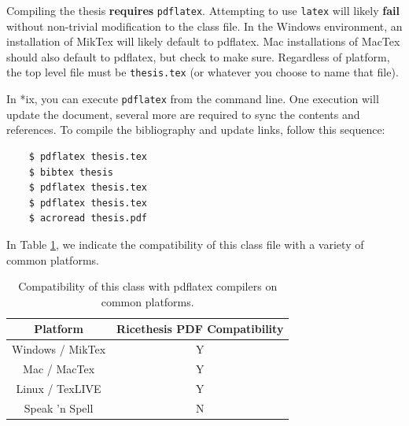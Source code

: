 Compiling the thesis \textbf{requires} \verb+pdflatex+.  Attempting to use \verb+latex+ will likely \textbf{fail} without non-trivial modification to the class file.  In the Windows environment, an installation of MikTex will likely default to pdflatex.  Mac installations of MacTex should also default to pdflatex, but check to make sure.  Regardless of platform, the top level file must be \verb+thesis.tex+ (or whatever you choose to name that file).

In *ix, you can execute \verb+pdflatex+ from the command line.  One execution will update the document, several more are required to sync the contents and references.  To compile the bibliography and update links, follow this sequence:

\singlespacing
\begin{verbatim}
	$ pdflatex thesis.tex
	$ bibtex thesis
	$ pdflatex thesis.tex
	$ pdflatex thesis.tex
	$ acroread thesis.pdf 
\end{verbatim}
\doublespacing

In Table \ref{tab:compatibility}, we indicate the compatibility of this class file with a variety of common platforms.

\begin{table}[ht]
	\centering
	\begin{tabular}{|c||c|}
		\hline Platform & Ricethesis PDF Compatibility\\
		\hline \hline Windows / MikTex & Y \\
		\hline Mac / MacTex & Y\\
		\hline Linux / TexLIVE & Y \\
		\hline Speak 'n Spell & N \\
		\hline
	\end{tabular}
	\caption[Compatibility Chart]{Compatibility of this class with pdflatex compilers on common platforms.}
	\label{tab:compatibility}
\end{table}

